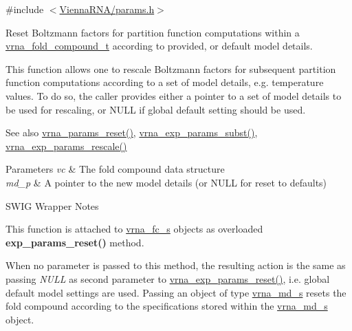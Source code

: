 {\ttfamily \#include $<$\hyperlink{params_8h}{Vienna\+R\+N\+A/params.\+h}$>$}



Reset Boltzmann factors for partition function computations within a \hyperlink{group__fold__compound_ga1b0cef17fd40466cef5968eaeeff6166}{vrna\+\_\+fold\+\_\+compound\+\_\+t} according to provided, or default model details. 

This function allows one to rescale Boltzmann factors for subsequent partition function computations according to a set of model details, e.\+g. temperature values. To do so, the caller provides either a pointer to a set of model details to be used for rescaling, or N\+U\+LL if global default setting should be used.

\begin{DoxySeeAlso}{See also}
\hyperlink{group__energy__parameters_gac40dc82e48a72a97cfc58b9da08a7792}{vrna\+\_\+params\+\_\+reset()}, \hyperlink{group__energy__parameters_ga8e7ac4fab3b0cc03afbc134eaafb3525}{vrna\+\_\+exp\+\_\+params\+\_\+subst()}, \hyperlink{group__energy__parameters_gad607bc3a5b5da16400e2ca4ea5560233}{vrna\+\_\+exp\+\_\+params\+\_\+rescale()} 
\end{DoxySeeAlso}

\begin{DoxyParams}{Parameters}
{\em vc} & The fold compound data structure \\
\hline
{\em md\+\_\+p} & A pointer to the new model details (or N\+U\+LL for reset to defaults)\\
\hline
\end{DoxyParams}
\begin{DoxyRefDesc}{S\+W\+I\+G Wrapper Notes}
\item[\hyperlink{wrappers__wrappers000047}{S\+W\+I\+G Wrapper Notes}]This function is attached to \hyperlink{group__fold__compound_structvrna__fc__s}{vrna\+\_\+fc\+\_\+s} objects as overloaded {\bfseries exp\+\_\+params\+\_\+reset()} method.

When no parameter is passed to this method, the resulting action is the same as passing {\itshape N\+U\+LL} as second parameter to \hyperlink{group__energy__parameters_gaa5409218068be84d7b50c78fbdaa85a9}{vrna\+\_\+exp\+\_\+params\+\_\+reset()}, i.\+e. global default model settings are used. Passing an object of type \hyperlink{structvrna__md__s}{vrna\+\_\+md\+\_\+s} resets the fold compound according to the specifications stored within the \hyperlink{structvrna__md__s}{vrna\+\_\+md\+\_\+s} object. \end{DoxyRefDesc}
